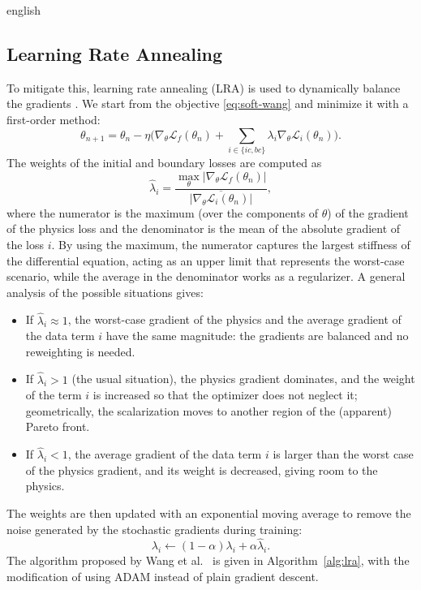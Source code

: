 \documentclass[11pt,letterpaper,twoside,openright]{book} %
\newcommand{\abs}[1]{\left\lvert #1 \right\rvert}
\newcommand{\Loss}{\mathcal{L}}
\newif\ifreviewmode
\newcommand{\revtag}[2]{\ifreviewmode{\color{red!70!black}\textsf{\footnotesize[#1#2]}}\fi}
\newcommand{\verificar}[1]{\revtag{VERIFICAR}{: #1}}
\begin{document}
\begin{hyphenrules}{english}
\subsection{Learning Rate Annealing}\label{subsec:lra}

To mitigate this, learning rate annealing (LRA) is used to dynamically balance the gradients
\cite{wang2021gradient}. We start from the objective \eqref{eq:soft-wang} and minimize it with a
first-order method:
\begin{equation}
  \theta_{n+1}=\theta_n-\eta\Big(\nabla_\theta\Loss_f(\theta_n)+\sum_{i\in\{ic,bc\}}\lambda_i\nabla_\theta\Loss_i(\theta_n)\Big).
  \label{eq:lra-update}
\end{equation}
The weights of the initial and boundary losses are computed as
\begin{equation}
  \hat\lambda_i=\frac{\max_\theta\abs{\nabla_\theta\Loss_f(\theta_n)}}{\overline{\abs{\nabla_\theta\Loss_i(\theta_n)}}},
  \label{eq:lra-weights}
\end{equation}
where the numerator is the maximum (over the components of $\theta$) of the gradient of the physics loss
and the denominator is the mean of the absolute gradient of the loss $i$.\verificar{whether the
denominator includes $\lambda_i$, as in the original Algorithm~1} By using the maximum, the numerator
captures the largest stiffness of the differential equation, acting as an upper limit that represents the
worst-case scenario, while the average in the denominator works as a regularizer. A general analysis of
the possible situations gives:
\begin{itemize}
  \item If $\hat\lambda_i\approx1$, the worst-case gradient of the physics and the average gradient of
    the data term $i$ have the same magnitude: the gradients are balanced and no reweighting is needed.
  \item If $\hat\lambda_i>1$ (the usual situation), the physics gradient dominates, and the weight of
    the term $i$ is increased so that the optimizer does not neglect it; geometrically, the
    scalarization moves to another region of the (apparent) Pareto front.
  \item If $\hat\lambda_i<1$, the average gradient of the data term $i$ is larger than the worst case of
    the physics gradient, and its weight is decreased, giving room to the physics.
\end{itemize}
The weights are then updated with an exponential moving average to remove the noise generated by the
stochastic gradients during training:
\begin{equation}
  \lambda_i\leftarrow(1-\alpha)\lambda_i+\alpha\hat\lambda_i.
  \label{eq:lra-ema}
\end{equation}
The algorithm proposed by Wang et al.~\cite{wang2021gradient} is given in Algorithm~\ref{alg:lra}, with the modification
of using ADAM instead of plain gradient descent.


\end{hyphenrules}
\end{document}
